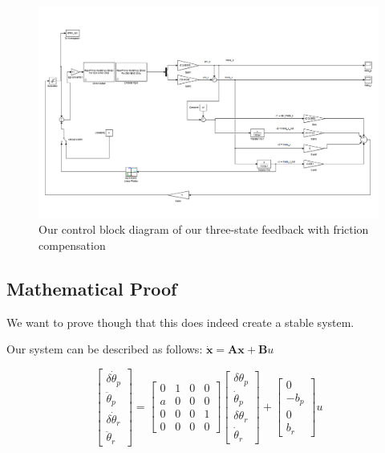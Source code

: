 \begin{figure}
  \caption{Our control block diagram of our three-state feedback with friction compensation}
  \centering
    \includegraphics[scale = 0.4]{three_state.PNG}
\end{figure}

\subsection{Mathematical Proof}
We want to prove though that this does indeed create a stable system.

Our system can be described as follows:
$\boldsymbol{\dot x = Ax+B}u$

$$
\begin{bmatrix}
\delta\dot\theta_p\\
\ddot\theta_p\\
\delta\dot\theta_r\\
\ddot\theta_r
\end{bmatrix}
=
\begin{bmatrix}
0 & 1 & 0 & 0\\
a & 0 & 0 & 0\\
0 & 0 & 0 & 1\\
0 & 0 & 0 & 0
\end{bmatrix}
\begin{bmatrix}
\delta\theta_p\\
\dot\theta_p\\
\delta\theta_r\\
\dot\theta_r
\end{bmatrix}
+
\begin{bmatrix}
0\\
-b_p\\
0\\
b_r
\end{bmatrix}
u$$

